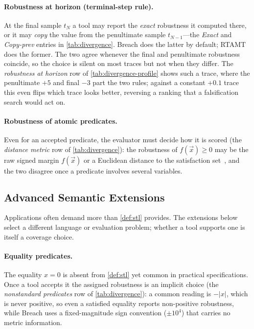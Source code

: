 \paragraph{Robustness at horizon (terminal-step rule).}
At the final sample $t_N$ a tool may report the \emph{exact} robustness it
computed there, or it may \emph{copy} the value from the penultimate sample
$t_{N-1}$---the \emph{Exact} and \emph{Copy-prev} entries in \cref{tab:divergence}.
Breach does the latter by default; RTAMT does the former. The two
agree whenever the final and penultimate robustness coincide, so the choice is
silent on most traces but not when they differ. The \emph{robustness at horizon}
row of \cref{tab:divergence-profile} shows such a trace, where the penultimate
$+5$ and final $-3$ part the two rules; against a constant $+0.1$ trace this even
flips which trace looks better, reversing a ranking that a falsification search
would act on.

\paragraph{Robustness of atomic predicates.}
Even for an accepted predicate, the evaluator must decide how it is scored
(the \emph{distance metric} row of \cref{tab:divergence}):
the robustness of $f(\vec{x}) \geq 0$ may be the raw signed margin
$f(\vec{x})$ or a Euclidean distance to the satisfaction
set~\cite{fainekos2009robustness}, and the two disagree once a predicate
involves several variables.

\subsection{Advanced Semantic Extensions}
\label{sec:app-ext}

Applications often demand more than \cref{def:stl} provides. The extensions
below select a different language or evaluation problem; whether a tool supports
one is itself a coverage choice.

\paragraph{Equality predicates.}
The equality $x = 0$ is absent from \cref{def:stl} yet common in practical
specifications. Once a tool accepts it the assigned robustness is an implicit
choice (the \emph{nonstandard predicates} row of \cref{tab:divergence}): a
common reading is $-|x|$, which is never positive, so even a satisfied equality
reports non-positive robustness, while Breach uses a fixed-magnitude sign
convention ($\pm 10^4$) that carries no metric information.

